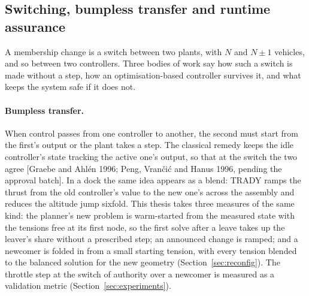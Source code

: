 
\subsection{Switching, bumpless transfer and runtime assurance}
\label{sec:lit_switching}

A membership change is a switch between two plants, with $N$ and $N \pm 1$ vehicles, and so between two
controllers. Three bodies of work say how such a switch is made without a step, how an optimisation-based
controller survives it, and what keeps the system safe if it does not.

\paragraph{Bumpless transfer.} When control passes from one controller to another, the second must start from
the first's output or the plant takes a step. The classical remedy keeps the idle controller's state tracking the
active one's output, so that at the switch the two agree [Graebe and Ahl\'en 1996; Peng, Vran\v{c}i\'c and Hanus
1996, pending the approval batch]. In a dock the same idea appears as a blend: TRADY \cite{sugihara2023trady}
ramps the thrust from the old controller's value to the new one's across the assembly and reduces the altitude
jump sixfold. This thesis takes three measures of the same kind: the planner's new problem is warm-started from
the measured state with the tensions free at its first node, so the first solve after a leave takes up the
leaver's share without a prescribed step; an announced change is ramped; and a newcomer is folded in from a small
starting tension, with every tension blended to the balanced solution for the new geometry
(Section~\ref{sec:reconfig}). The throttle step at the switch of authority over a newcomer is measured as a
validation metric (Section~\ref{sec:experiments}).

